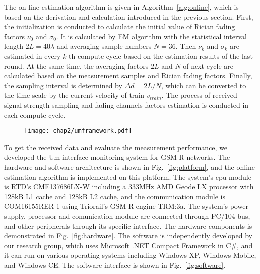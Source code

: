 The on-line estimation algorithm is given in Algorithm~\ref{alg:online}, which is based on the derivation and calculation introduced in the previous section. First, the initialization is conducted to calculate the initial value of Rician fading factors $\nu_0$ and $\sigma_0$. It is calculated by EM algorithm with the statistical interval length $2L=40\lambda$ and averaging sample numbers $N=36$. Then $\nu_k$ and $\sigma_k$ are estimated in every $k$-th compute cycle based on the estimation results of the last round. At the same time, the averaging factors $2L$ and $N$ of next cycle are calculated based on the measurement samples and Rician fading factors. Finally, the sampling interval is determined by $\Delta d=2L/N$, which can be converted to the time scale by the current velocity of train $v_{train}$. The process of received signal strength sampling and fading channels factors estimation is conducted in each compute cycle.

\begin{figure}[!htp]
\centering
    \texttt{[image: chap2/umframework.pdf]}
\end{figure}

To get the received data and evaluate the measurement performance, we developed the Um interface monitoring system for GSM-R networks. The hardware and software architecture is shown in Fig.~\ref{fig:platform}, and the online estimation algorithm is implemented on this platform. The system's cpu module is RTD's CME137686LX-W including a 333MHz AMD Geode LX processor with 128kB L1 cache and 128kB L2 cache, and the communication module is COM16155RER-1 using Triorail's GSM-R engine TRM:3a. The system's power supply, processor and comunication module are connected through PC/104 bus, and other peripherals through its specific interface. The hardware components is demonstrated in Fig.~\ref{fig:hardware}. The software is independently developed by our research group, which uses Microsoft .NET Compact Framework in C\#, and it can run on various operating systems including Windows XP, Windows Mobile, and Windows CE. The software interface is shown in Fig.~\ref{fig:software}.

\begin{figure}[!htp]
\centering
{}
    \hspace{1cm}
\end{figure}

